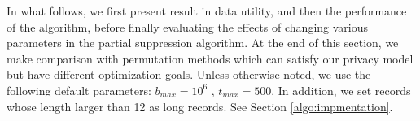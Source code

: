 

In what follows, we first present result in data utility, and then the
performance of the algorithm, before finally evaluating the effects of
changing various parameters in the partial suppression algorithm. At the end
of this section, we make comparison with permutation methods which can
satisfy our privacy model but have different optimization goals. Unless
otherwise noted, we use the following default parameters: $b_{max} = 10^6$ ,
$t_{max}=500$. In addition, we set records whose length larger than 12 as
long records.
See Section
\ref{algo:impmentation}.


%

